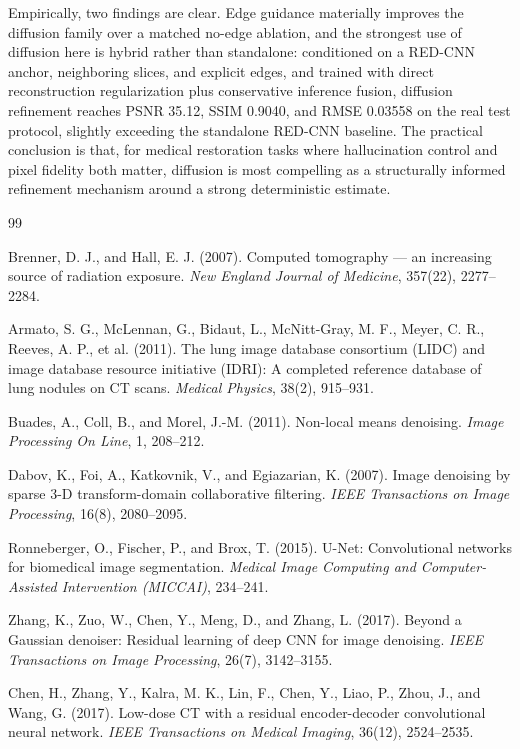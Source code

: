 \documentclass{article}
\begin{document}
Empirically, two findings are clear. Edge guidance materially improves the diffusion family over a matched no-edge ablation, and the strongest use of diffusion here is hybrid rather than standalone: conditioned on a RED-CNN anchor, neighboring slices, and explicit edges, and trained with direct reconstruction regularization plus conservative inference fusion, diffusion refinement reaches PSNR 35.12, SSIM 0.9040, and RMSE 0.03558 on the real test protocol, slightly exceeding the standalone RED-CNN baseline. The practical conclusion is that, for medical restoration tasks where hallucination control and pixel fidelity both matter, diffusion is most compelling as a structurally informed refinement mechanism around a strong deterministic estimate.

\clearpage
{\small
\begin{thebibliography}{99}
\setlength{\itemsep}{0.1em}

Brenner, D. J., and Hall, E. J. (2007).
Computed tomography --- an increasing source of radiation exposure.
\textit{New England Journal of Medicine}, 357(22), 2277--2284.

Armato, S. G., McLennan, G., Bidaut, L., McNitt-Gray, M. F., Meyer, C. R., Reeves, A. P., et al. (2011).
The lung image database consortium (LIDC) and image database resource initiative (IDRI): A completed reference database of lung nodules on CT scans.
\textit{Medical Physics}, 38(2), 915--931.

Buades, A., Coll, B., and Morel, J.-M. (2011).
Non-local means denoising.
\textit{Image Processing On Line}, 1, 208--212.

Dabov, K., Foi, A., Katkovnik, V., and Egiazarian, K. (2007).
Image denoising by sparse 3-D transform-domain collaborative filtering.
\textit{IEEE Transactions on Image Processing}, 16(8), 2080--2095.

Ronneberger, O., Fischer, P., and Brox, T. (2015).
U-Net: Convolutional networks for biomedical image segmentation.
\textit{Medical Image Computing and Computer-Assisted Intervention (MICCAI)}, 234--241.

Zhang, K., Zuo, W., Chen, Y., Meng, D., and Zhang, L. (2017).
Beyond a Gaussian denoiser: Residual learning of deep CNN for image denoising.
\textit{IEEE Transactions on Image Processing}, 26(7), 3142--3155.

Chen, H., Zhang, Y., Kalra, M. K., Lin, F., Chen, Y., Liao, P., Zhou, J., and Wang, G. (2017).
Low-dose CT with a residual encoder-decoder convolutional neural network.
\textit{IEEE Transactions on Medical Imaging}, 36(12), 2524--2535.


\end{thebibliography}}
\end{document}
